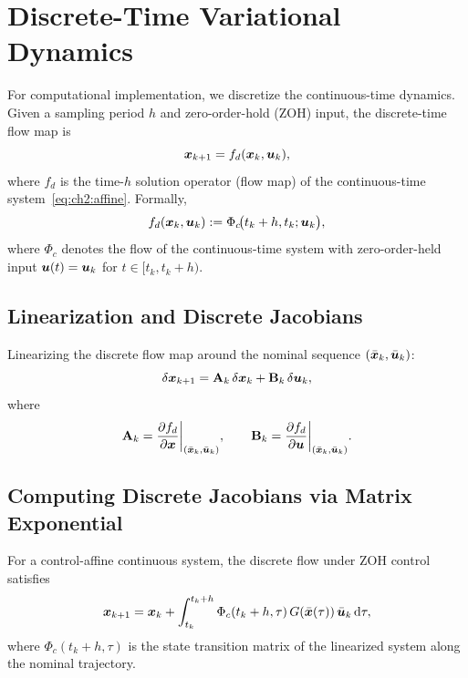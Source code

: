 \section{Discrete-Time Variational Dynamics}

For computational implementation, we discretize the continuous-time dynamics. Given a sampling period $h$
and zero-order-hold (ZOH) input, the discrete-time flow map is
\begin{equation}
\bm{x}_{k+1} = f_d(\bm{x}_k, \bm{u}_k),
\label{eq:ch2:discrete-flow}
\end{equation}
where $f_d$ is the time-$h$ solution operator (flow map) of the continuous-time system~\eqref{eq:ch2:affine}.
Formally,
\begin{equation}
f_d(\bm{x}_k,\bm{u}_k) := \Phi_c\!\bigl(t_k+h, t_k; \bm{u}_k\bigr),
\end{equation}
where $\Phi_c$ denotes the flow of the continuous-time system with zero-order-held input $\bm{u}(t) = \bm{u}_k$ for $t\in[t_k,t_k+h)$.

\subsection{Linearization and Discrete Jacobians}

Linearizing the discrete flow map around the nominal sequence $(\bar{\bm{x}}_k, \bar{\bm{u}}_k)$:
\begin{equation}
\delta\bm{x}_{k+1} = \mathbf{A}_k\,\delta\bm{x}_k + \mathbf{B}_k\,\delta\bm{u}_k,
\label{eq:ch2:discrete-variational}
\end{equation}
where
\begin{equation}
\mathbf{A}_k = \frac{\partial f_d}{\partial \bm{x}}\bigg|_{(\bar{\bm{x}}_k,\bar{\bm{u}}_k)},
\qquad
\mathbf{B}_k = \frac{\partial f_d}{\partial \bm{u}}\bigg|_{(\bar{\bm{x}}_k,\bar{\bm{u}}_k)}.
\label{eq:ch2:discrete-jacobians}
\end{equation}

\subsection{Computing Discrete Jacobians via Matrix Exponential}

For a control-affine continuous system, the discrete flow under ZOH control satisfies
\begin{equation}
\bm{x}_{k+1} = \bm{x}_k + \int_{t_k}^{t_k+h}\Phi_c(t_k+h,\tau)\,G(\bar{\bm{x}}(\tau))\,\bar{\bm{u}}_k\,\mathrm{d}\tau,
\end{equation}
where $\Phi_c(t_k+h,\tau)$ is the state transition matrix of the linearized system along the nominal trajectory.


